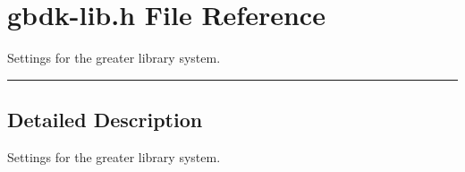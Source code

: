 \section{gbdk-lib.h File Reference}
\label{gbdk-lib.h}
Settings for the greater library system. 


\vspace{0.4cm}\hrule\vspace{0.2cm}
\subsection*{Detailed Description}
Settings for the greater library system.